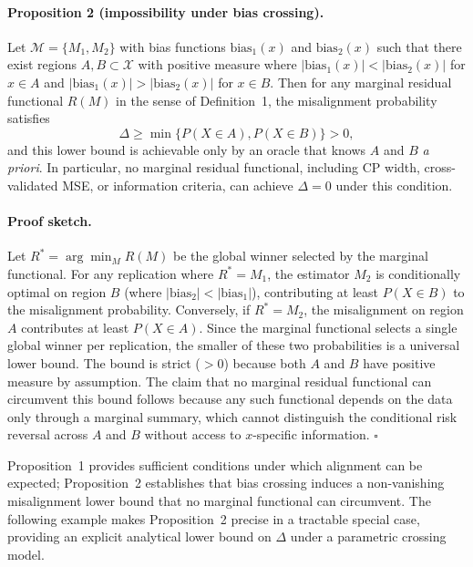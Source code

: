 \documentclass[a4paper,11pt]{article}
\begin{document}
\paragraph{Proposition 2 (impossibility under bias crossing).}
Let $\mathcal{M} = \{M_1, M_2\}$ with bias functions $\text{bias}_1(x)$ and $\text{bias}_2(x)$ such that there exist regions $A, B \subset \mathcal{X}$ with positive measure where $|\text{bias}_1(x)| < |\text{bias}_2(x)|$ for $x \in A$ and $|\text{bias}_1(x)| > |\text{bias}_2(x)|$ for $x \in B$. Then for any marginal residual functional $R(M)$ in the sense of Definition~1, the misalignment probability satisfies
\begin{equation}
    \Delta \geq \min\{P(X \in A), P(X \in B)\} > 0,
\end{equation}
and this lower bound is achievable only by an oracle that knows $A$ and $B$ \emph{a priori}. In particular, no marginal residual functional, including CP width, cross-validated MSE, or information criteria, can achieve $\Delta = 0$ under this condition.

\paragraph{Proof sketch.}
Let $R^* = \arg\min_M R(M)$ be the global winner selected by the marginal functional. For any replication where $R^* = M_1$, the estimator $M_2$ is conditionally optimal on region $B$ (where $|\text{bias}_2| < |\text{bias}_1|$), contributing at least $P(X \in B)$ to the misalignment probability. Conversely, if $R^* = M_2$, the misalignment on region $A$ contributes at least $P(X \in A)$. Since the marginal functional selects a single global winner per replication, the smaller of these two probabilities is a universal lower bound. The bound is strict ($>0$) because both $A$ and $B$ have positive measure by assumption. The claim that no marginal residual functional can circumvent this bound follows because any such functional depends on the data only through a marginal summary, which cannot distinguish the conditional risk reversal across $A$ and $B$ without access to $x$-specific information. $\square$

Proposition~1 provides sufficient conditions under which alignment can be expected; Proposition~2 establishes that bias crossing induces a non-vanishing misalignment lower bound that no marginal functional can circumvent. The following example makes Proposition~2 precise in a tractable special case, providing an explicit analytical lower bound on $\Delta$ under a parametric crossing model.
\end{document}

